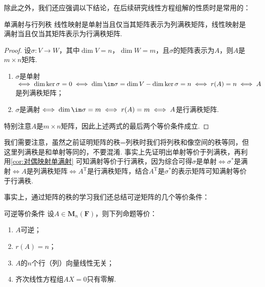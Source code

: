 除此之外，我们还应强调以下结论，在后续研究线性方程组解的性质时是常用的：
\begin{theorem}{}{单满射与行列秩}
    线性映射是单射当且仅当其矩阵表示为列满秩矩阵，线性映射是满射当且仅当其矩阵表示为行满秩矩阵.
\end{theorem}

\begin{proof}
    设$\sigma:V\to W$，其中$\dim V=n$，$\dim W=m$，且$\sigma$的矩阵表示为$A$，则$A$是$m\times n$矩阵.
    \begin{enumerate}
        \item $\sigma$是单射$\iff\dim\ker\sigma=0\iff \dim\im\sigma=\dim V-\dim\ker\sigma=n\iff r(A)=n\iff A$是列满秩矩阵；

        \item $\sigma$是满射$\iff\dim\im\sigma=m\iff r(A)=m\iff A$是行满秩矩阵.
    \end{enumerate}
    特别注意$A$是$m\times n$矩阵，因此上述两式的最后两个等价条件成立.
\end{proof}

我们需要注意，虽然之前证明矩阵的秩=列秩时我们将列秩和像空间的秩等同，但这里列满秩是和单射等同的，不要混淆. 事实上先证明出单射等价于列满秩，再利用\autoref{cor:对偶映射单满射} 可知满射等价于行满秩，因为综合可得$\sigma$是单射$\iff\sigma^*$是满射$\iff A$是列满秩矩阵$\iff A^\mathrm{T}$是行满秩矩阵，结合$A^\mathrm{T}$是$\sigma^*$的表示矩阵可知满射等价于行满秩.

事实上，通过矩阵的秩的学习我们还总结可逆矩阵的几个等价条件：
\begin{theorem}{}{可逆等价条件}
    设$A \in \mathbf{M}_n(\mathbf{F})$，则下列命题等价：
    \begin{enumerate}[label=(\arabic*)]
        \item \label{item:11:可逆等价条件:1}
              $A$可逆；

        \item \label{item:11:可逆等价条件:2}
              $r(A)=n$；

        \item \label{item:11:可逆等价条件:3}
              $A$的$n$个行（列）向量线性无关；

        \item \label{item:11:可逆等价条件:4}
              齐次线性方程组$AX=0$只有零解.
    \end{enumerate}
\end{theorem}

